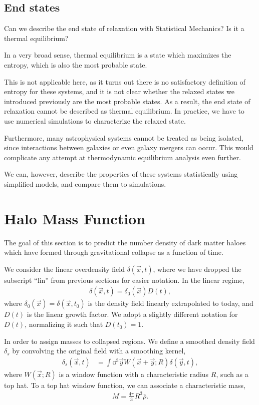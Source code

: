 \subsection{End states}

Can we describe the end state of relaxation with Statistical Mechanics?
Is it a thermal equilibrium?

In a very broad sense, thermal equilibrium is a state which maximizes the entropy, which is also the most probable state.

This is not applicable here, as it turns out there is no satisfactory definition of entropy for these systems,
and it is not clear whether the relaxed states we introduced previously are the most probable states.
As a result, the end state of relaxation cannot be described as thermal equilibrium.
In practice, we have to use numerical simulations to characterize the relaxed state.

Furthermore, many astrophysical systems cannot be treated as being isolated, since interactions between galaxies or even galaxy mergers can occur.
This would complicate any attempt at thermodynamic equilibrium analysis even further.

We can, however, describe the properties of these systems statistically using simplified models, and compare them to simulations.


\section{Halo Mass Function}

The goal of this section is to predict the number density of dark matter haloes which have formed through gravitational collapse as a function of time.

We consider the linear overdensity field $\delta(\vec{x}, t)$, where we have dropped the subscript \enquote{$\text{lin}$} from previous sections for easier notation.
In the linear regime, 
\begin{align*}
	\delta(\vec{x},t) = \delta_0(\vec{x}) D(t),
\end{align*}
where $\delta_0(\vec{x}) = \delta(\vec{x}, t_0)$ is the density field linearly extrapolated to today, and $D(t)$ is the linear growth factor.
We adopt a slightly different notation for $D(t)$, normalizing it such that $D(t_0) = 1$.

In order to assign masses to collapsed regions. We define a smoothed density field $\delta_s$ by convolving the original field with a smoothing kernel,
\begin{align*}
	\delta_s(\vec{x}, t)
	&= \int \dd{^3 \vec{y}} W(\vec{x}+\vec{y}; R) \delta(\vec{y}, t),
\end{align*}
where $W(\vec{x}; R)$ is a window function with a characteristic radius $R$, such as a top hat.
To a top hat window function, we can associate a characteristic mass,
\begin{align*}
	M = \frac{4\pi}{3} R^3 \bar{\rho}.
\end{align*}

